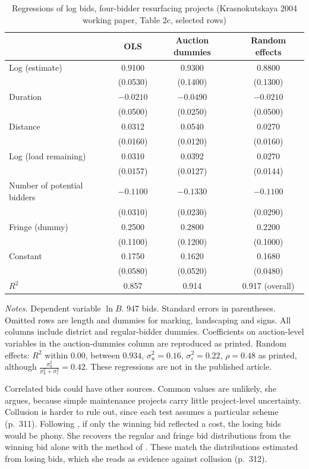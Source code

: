 \begin{table}[htbp]
\centering
\caption{Regressions of log bids, four-bidder resurfacing projects (Krasnokutskaya 2004 working
paper, Table 2c, selected rows)}
\label{tab:15-krasno-bids}
\begin{tabular}{lccc}
\toprule
 & OLS & Auction dummies & Random effects\\
\midrule
Log (estimate) & 0.9100 & 0.9300 & 0.8800\\
 & (0.0530) & (0.1400) & (0.1300)\\
Duration & $-0.0210$ & $-0.0490$ & $-0.0210$\\
 & (0.0500) & (0.0250) & (0.0500)\\
Distance & 0.0312 & 0.0540 & 0.0270\\
 & (0.0160) & (0.0120) & (0.0160)\\
Log (load remaining) & 0.0310 & 0.0392 & 0.0270\\
 & (0.0157) & (0.0127) & (0.0144)\\
Number of potential bidders & $-0.1100$ & $-0.1330$ & $-0.1100$\\
 & (0.0310) & (0.0230) & (0.0290)\\
Fringe (dummy) & 0.2500 & 0.2800 & 0.2200\\
 & (0.1100) & (0.1200) & (0.1000)\\
Constant & 0.1750 & 0.1620 & 0.1680\\
 & (0.0580) & (0.0520) & (0.0480)\\
\addlinespace
$R^2$ & 0.857 & 0.914 & 0.917 (overall)\\
\bottomrule
\end{tabular}

\smallskip
\begin{minipage}{0.93\textwidth}
\footnotesize \textit{Notes.} Dependent variable $\ln B$. 947 bids. Standard errors in parentheses. Omitted rows
are length and dummies for marking, landscaping and signs. All columns include district and
regular-bidder dummies. Coefficients on auction-level variables in the auction-dummies column are
reproduced as printed. Random effects: $R^2$ within $0.00$, between $0.934$, $\sigma_u^2=0.16$,
$\sigma_\varepsilon^2=0.22$, $\rho=0.48$ as printed, although $\frac{\sigma_u^2}{\sigma_u^2+\sigma_\varepsilon^2}=0.42$.
These regressions are not in the published article.
\end{minipage}
\end{table}

Correlated bids could have other sources. Common values are unlikely, she argues, because simple
maintenance projects carry little project-level uncertainty. Collusion is harder to rule out, since
each test assumes a particular scheme (p.~311). Following \citet{PorterZona1993}, if only the winning
bid reflected a cost, the losing bids would be phony. She recovers the regular and fringe bid
distributions from the winning bid alone with the method of \citet{AtheyHaile2002}. These match the
distributions estimated from losing bids, which she reads as evidence against collusion (p.~312).

